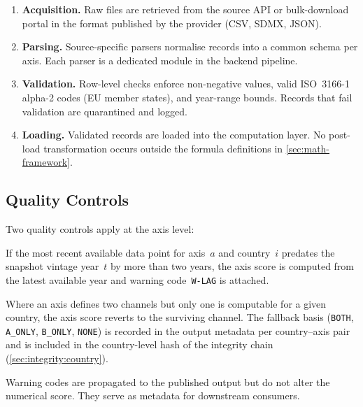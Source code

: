 \begin{enumerate}
  \item \textbf{Acquisition.}  Raw files are retrieved from the source API or
    bulk-download portal in the format published by the provider (CSV, SDMX,
    JSON).
  \item \textbf{Parsing.}  Source-specific parsers normalise records into a
    common schema per axis.  Each parser is a dedicated module in the backend
    pipeline.
  \item \textbf{Validation.}  Row-level checks enforce non-negative values,
    valid ISO~3166-1 alpha-2 codes (EU member states), and year-range bounds.
    Records that fail validation are quarantined and logged.
  \item \textbf{Loading.}  Validated records are loaded into the computation
    layer.  No post-load transformation occurs outside the formula
    definitions in \cref{sec:math-framework}.
\end{enumerate}

\subsection{Quality Controls}\label{sec:data:quality}

Two quality controls apply at the axis level:

\begin{description}[style=nextline]
  \item[Temporal gap detection.]
    If the most recent available data point for axis~\(a\) and country~\(i\)
    predates the snapshot vintage year~\(t\) by more than two years, the axis
    score is computed from the latest available year and warning
    code~\texttt{W-LAG} is attached.
  \item[Channel fallback basis.]
    Where an axis defines two channels but only one is computable for a given
    country, the axis score reverts to the surviving channel.  The fallback
    basis (\texttt{BOTH}, \texttt{A\_ONLY}, \texttt{B\_ONLY}, \texttt{NONE})
    is recorded in the output metadata per country--axis pair and is included
    in the country-level hash of the integrity chain
    (\cref{sec:integrity:country}).
\end{description}

Warning codes are propagated to the published output but do not alter the
numerical score.  They serve as metadata for downstream consumers.